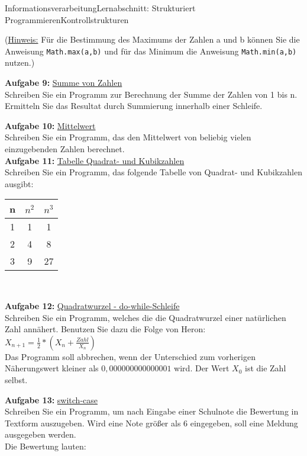 \documentclass[oneside,openany,headings=optiontotoc,11pt,numbers=noenddot]{scrreprt}
\begin{document}
\begin{worksheet}{Informationsverarbeitung}{Lernabschnitt: Strukturiert Programmieren}{Kontrollstrukturen}
\begin{framed}
			(\underline{Hinweis:} Für die Bestimmung des Maximums der Zahlen a und b können Sie die Anweisung \lstinline[style=JavaInputStyle]|Math.max(a,b)| und für das Minimum die Anweisung \lstinline[style=JavaInputStyle]|Math.min(a,b)| nutzen.)\\
			\par\noindent
			\textbf{Aufgabe 9:} \underline{Summe von Zahlen}\\
			Schreiben Sie ein Programm zur Berechnung der Summe der Zahlen von 1 bis n. Ermitteln Sie das Resultat durch Summierung innerhalb einer Schleife.\\
			\par\noindent
			\textbf{Aufgabe 10:} \underline{Mittelwert}\\
			Schreiben Sie ein Programm, das den Mittelwert von beliebig vielen einzugebenden Zahlen berechnet.\\
			\newpage
			\noindent
			\textbf{Aufgabe 11:} \underline{Tabelle Quadrat- und Kubikzahlen}\\
			Schreiben Sie ein Programm, das folgende Tabelle von Quadrat- und Kubikzahlen ausgibt:\\
			\begin{tabular}{ccc}
				n & \(n^2\) & \(n^3\)\\
				\hline
				1 & 1 & 1\\
				2 & 4 & 8\\
				3 & 9 & 27
			\end{tabular}\\
			\par\noindent
			\textbf{Aufgabe 12:} \underline{Quadratwurzel - do-while-Schleife}\\
			Schreiben Sie ein Programm, welches die die Quadratwurzel einer natürlichen Zahl annähert. Benutzen Sie dazu die Folge von Heron:\\
			\(X_{n+1} = \frac{1}{2}*(X_n+\frac{Zahl}{X_n})\)\\
			Das Programm soll abbrechen, wenn der Unterschied zum vorherigen Näherungswert kleiner als \(0,000 000 000 000 001\) wird. Der Wert \(X_0\) ist die Zahl selbst.\\
			\par\noindent
			\textbf{Aufgabe 13:} \underline{switch-case}\\
			Schreiben Sie ein Programm, um nach Eingabe einer Schulnote die Bewertung in Textform auszugeben. Wird eine Note größer als 6 eingegeben, soll eine Meldung ausgegeben werden.\\
			Die Bewertung lauten:\\

\end{framed}
\end{worksheet}
\end{document}
